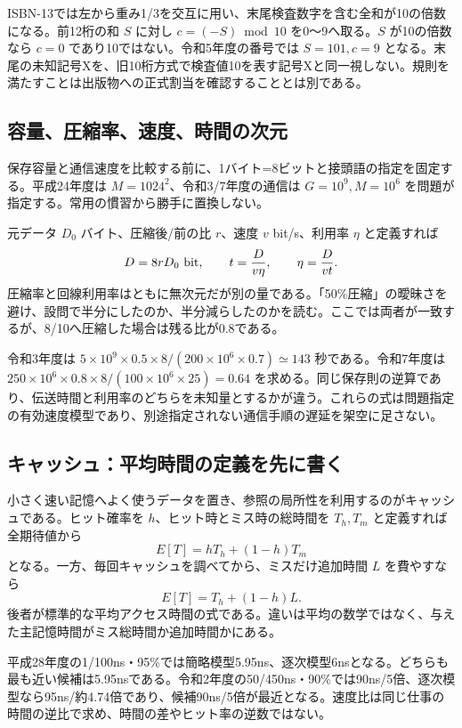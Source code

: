 ISBN-13では左から重み1/3を交互に用い、末尾検査数字を含む全和が10の倍数になる\cite{info_isbn}。前12桁の和 \(S\) に対し \(c=(-S)\bmod10\) を0〜9へ取る。\(S\) が10の倍数なら \(c=0\) であり10ではない。令和5年度の番号では \(S=101,c=9\) となる。末尾の未知記号Xを、旧10桁方式で検査値10を表す記号Xと同一視しない。規則を満たすことは出版物への正式割当を確認することとは別である。

\subsection{容量、圧縮率、速度、時間の次元}
\label{theory:information:transfer}
保存容量と通信速度を比較する前に、1バイト=8ビットと接頭語の指定を固定する。平成24年度は \(M=1024^2\)、令和3/7年度の通信は \(G=10^9,M=10^6\) を問題が指定する。常用の慣習から勝手に置換しない。

元データ \(D_0\) バイト、圧縮後/前の比 \(r\)、速度 \(v\) bit/s、利用率 \(\eta\) と定義すれば
\[
 D=8rD_0\ {\rm bit},\qquad t=\frac{D}{v\eta},\qquad
 \eta=\frac{D}{vt}.
\]
圧縮率と回線利用率はともに無次元だが別の量である。「50\%圧縮」の曖昧さを避け、設問で半分にしたのか、半分減らしたのかを読む。ここでは両者が一致するが、8/10へ圧縮した場合は残る比が0.8である。

令和3年度は \(5\times10^9\times0.5\times8/(200\times10^6\times0.7)\simeq143\) 秒である。令和7年度は \(250\times10^6\times0.8\times8/(100\times10^6\times25)=0.64\) を求める。同じ保存則の逆算であり、伝送時間と利用率のどちらを未知量とするかが違う。これらの式は問題指定の有効速度模型であり、別途指定されない通信手順の遅延を架空に足さない。

\subsection{キャッシュ：平均時間の定義を先に書く}
\label{theory:information:cache}
小さく速い記憶へよく使うデータを置き、参照の局所性を利用するのがキャッシュである。ヒット確率を \(h\)、ヒット時とミス時の総時間を \(T_h,T_m\) と定義すれば全期待値から
\[
 E[T]=hT_h+(1-h)T_m
\]
となる。一方、毎回キャッシュを調べてから、ミスだけ追加時間 \(L\) を費やすなら
\[
 E[T]=T_h+(1-h)L.
\]
後者が標準的な平均アクセス時間の式である\cite{info_cache}。違いは平均の数学ではなく、与えた主記憶時間がミス総時間か追加時間かにある。

平成28年度の1/100ns・95\%では簡略模型5.95ns、逐次模型6nsとなる。どちらも最も近い候補は5.95nsである。令和2年度の50/450ns・90\%では90ns/5倍、逐次模型なら95ns/約4.74倍であり、候補90ns/5倍が最近となる。速度比は同じ仕事の時間の逆比で求め、時間の差やヒット率の逆数ではない。

